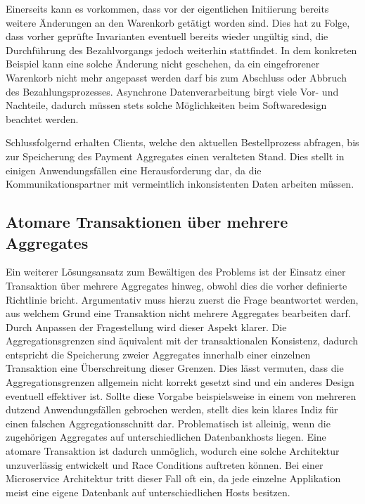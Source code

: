 Einerseits kann es vorkommen, dass vor der eigentlichen Initiierung bereits weitere Änderungen an den Warenkorb getätigt worden sind. Dies hat zu Folge, dass vorher geprüfte Invarianten eventuell bereits wieder ungültig sind, die Durchführung des Bezahlvorgangs jedoch weiterhin stattfindet. In dem konkreten Beispiel kann eine solche Änderung nicht geschehen, da ein eingefrorener Warenkorb nicht mehr angepasst werden darf bis zum Abschluss oder Abbruch des Bezahlungsprozesses. Asynchrone Datenverarbeitung birgt viele Vor- und Nachteile, dadurch müssen stets solche Möglichkeiten beim Softwaredesign beachtet werden.

Schlussfolgernd erhalten Clients, welche den aktuellen Bestellprozess abfragen, bis zur Speicherung des Payment Aggregates einen veralteten Stand. Dies stellt in einigen Anwendungsfällen eine Herausforderung dar, da die Kommunikationspartner mit vermeintlich inkonsistenten Daten arbeiten müssen.

\subsection{Atomare Transaktionen über mehrere Aggregates}

Ein weiterer Lösungsansatz zum Bewältigen des Problems ist der Einsatz einer Transaktion über mehrere Aggregates hinweg, obwohl dies die vorher definierte Richtlinie bricht. Argumentativ muss hierzu zuerst die Frage beantwortet werden, aus welchem Grund eine Transaktion nicht mehrere Aggregates bearbeiten darf. Durch Anpassen der Fragestellung wird dieser Aspekt klarer. Die Aggregationsgrenzen sind äquivalent mit der transaktionalen Konsistenz, dadurch entspricht die Speicherung zweier Aggregates innerhalb einer einzelnen Transaktion eine Überschreitung dieser Grenzen. Dies lässt vermuten, dass die Aggregationsgrenzen allgemein nicht korrekt gesetzt sind und ein anderes Design eventuell effektiver ist. Sollte diese Vorgabe beispielsweise in einem von mehreren dutzend Anwendungsfällen gebrochen werden, stellt dies kein klares Indiz für einen falschen Aggregationsschnitt dar. Problematisch ist alleinig, wenn die zugehörigen Aggregates auf unterschiedlichen Datenbankhosts liegen. Eine atomare Transaktion ist dadurch unmöglich, wodurch eine solche Architektur unzuverlässig entwickelt und Race Conditions auftreten können. Bei einer Microservice Architektur tritt dieser Fall oft ein, da jede einzelne Applikation meist eine eigene Datenbank auf unterschiedlichen Hosts besitzen. 

